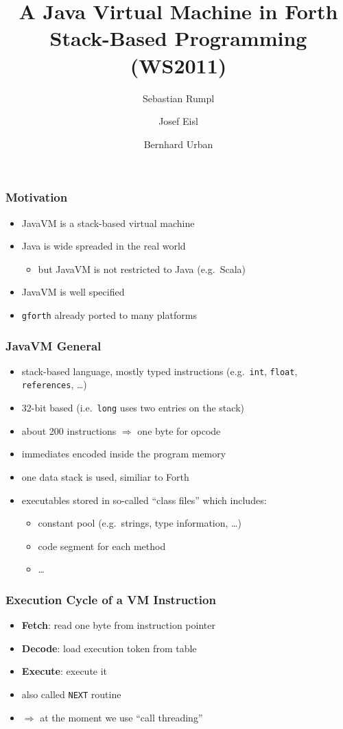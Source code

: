 \documentclass{beamer}
\title{A Java Virtual Machine in Forth\\\small{Stack-Based Programming (WS2011)}}
\author{Sebastian Rumpl \and Josef Eisl \and Bernhard Urban}
\begin{document}
\frame{\titlepage}
\begin{frame}
	\frametitle{Motivation}
	\begin{itemize}
		\item JavaVM is a stack-based virtual machine
		\item Java is wide spreaded in the real world
		\begin{itemize}
			\item but JavaVM is not restricted to Java (e.g.\ Scala)
		\end{itemize}
		\item JavaVM is well specified %
		\item \texttt{gforth} already ported to many platforms
	\end{itemize}
\end{frame}
\begin{frame}
	\frametitle{JavaVM General}
	\begin{itemize}
		\item stack-based language, mostly typed instructions (e.g.\
		\texttt{int}, \texttt{float}, \texttt{references}, \dots)
		\item 32-bit based (i.e.\ \texttt{long} uses two entries on the stack)
		\item about 200 instructions $\Rightarrow$ one byte for opcode
		\item immediates encoded inside the program memory
		\item one data stack is used, similiar to Forth
		\item executables stored in so-called ``class files'' which includes:
		\begin{itemize}
			\item constant pool (e.g.\ strings, type information, \dots)
			\item code segment for each method
			\item \dots
		\end{itemize}
	\end{itemize}
\end{frame}
\begin{frame}
	\frametitle{Execution Cycle of a VM Instruction}
	\begin{itemize}
		\item \textbf{Fetch}: read one byte from instruction pointer
		\item \textbf{Decode}: load execution token from table
		\item \textbf{Execute}: execute it
		\item also called \texttt{NEXT} routine
		\item $\Rightarrow$ at the moment we use ``call threading''
	\end{itemize}
\end{frame}
\end{document}
